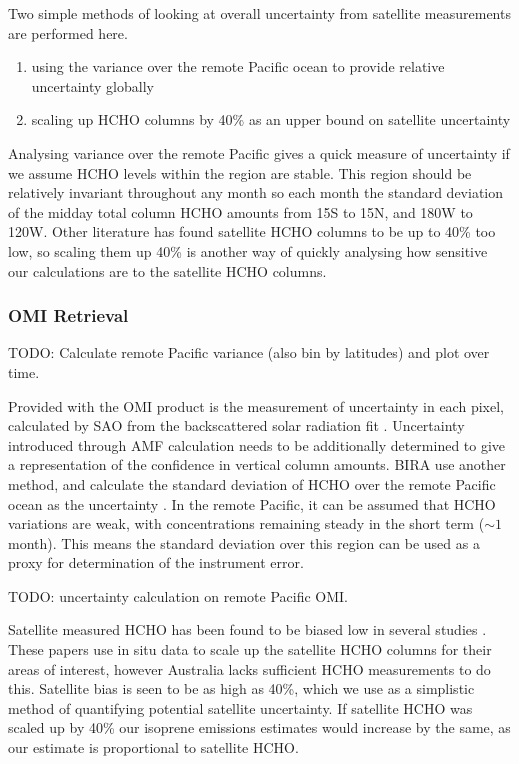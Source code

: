     
    Two simple methods of looking at overall uncertainty from satellite measurements are performed here.
    \begin{enumerate}
      \item using the variance over the remote Pacific ocean to provide relative uncertainty globally \parencite[e.g.][]{DeSmedt2012}
      \item scaling up HCHO columns by 40\% as an upper bound on satellite uncertainty
    \end{enumerate}
    Analysing variance over the remote Pacific gives a quick measure of uncertainty if we assume HCHO levels within the region are stable.
    This region should be relatively invariant throughout any month so each month the standard deviation of the midday total column HCHO amounts from 15\degr S to 15\degr N, and 180\degr W to 120\degr W.
    Other literature has found satellite HCHO columns to be up to 40\% too low, so scaling them up 40\% is another way of quickly analysing how sensitive our calculations are to the satellite HCHO columns.
    
    
    \subsubsection{OMI Retrieval}
      \label{BioIsop:uncertainty:satellite:retrieval}
      TODO: Calculate remote Pacific variance (also bin by latitudes) and plot over time. 
      
      
      Provided with the OMI product is the measurement of uncertainty in each pixel, calculated by SAO from the backscattered solar radiation fit \parencite{Abad2015,Abad2016}.
      Uncertainty introduced through AMF calculation needs to be additionally determined to give a representation of the confidence in vertical column amounts.
      BIRA use another method, and calculate the standard deviation of HCHO over the remote Pacific ocean as the uncertainty \parencite{DeSmedt2012, DeSmedt2015}.
      In the remote Pacific, it can be assumed that HCHO variations are weak, with concentrations remaining steady in the short term ($\sim 1$ month).
      This means the standard deviation over this region can be used as a proxy for determination of the instrument error.
      
      
      TODO: uncertainty calculation on remote Pacific OMI.
      
      Satellite measured HCHO has been found to be biased low in several studies \parencite[e.g.][]{Zhu2016,DeSmedt2015,Barkley2013}.
      These papers use in situ data to scale up the satellite HCHO columns for their areas of interest, however Australia lacks sufficient HCHO measurements to do this.
      Satellite bias is seen to be as high as 40\%, which we use as a simplistic method of quantifying potential satellite uncertainty.
      If satellite HCHO was scaled up by 40\% our isoprene emissions estimates would increase by the same, as our estimate is proportional to satellite HCHO.
      

